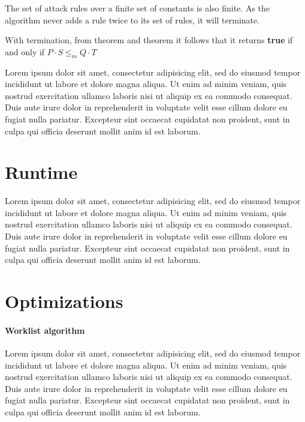 The set of attack rules over a finite set of constants
is also finite.
As the algorithm never adds a rule twice to its set
of rules, it will terminate.

With termination, 
from theorem \label{theorem:refinement-tree} and
theorem \label{theorem:tree-attack} it follows
that it returns \textbf{true} if and only
if $P⋅S ≤_m Q⋅T$

Lorem ipsum dolor sit amet, consectetur adipisicing elit, sed do eiusmod tempor incididunt ut labore et dolore magna aliqua. Ut enim ad minim veniam, quis nostrud exercitation ullamco laboris nisi ut aliquip ex ea commodo consequat. Duis aute irure dolor in reprehenderit in voluptate velit esse cillum dolore eu fugiat nulla pariatur. Excepteur sint occaecat cupidatat non proident, sunt in culpa qui officia deserunt mollit anim id est laborum.


\section{Runtime}

Lorem ipsum dolor sit amet, consectetur adipisicing elit, sed do eiusmod tempor incididunt ut labore et dolore magna aliqua. Ut enim ad minim veniam, quis nostrud exercitation ullamco laboris nisi ut aliquip ex ea commodo consequat. Duis aute irure dolor in reprehenderit in voluptate velit esse cillum dolore eu fugiat nulla pariatur. Excepteur sint occaecat cupidatat non proident, sunt in culpa qui officia deserunt mollit anim id est laborum.


\section{Optimizations}

\paragraph{Worklist algorithm}

Lorem ipsum dolor sit amet, consectetur adipisicing elit, sed do eiusmod tempor incididunt ut labore et dolore magna aliqua. Ut enim ad minim veniam, quis nostrud exercitation ullamco laboris nisi ut aliquip ex ea commodo consequat. Duis aute irure dolor in reprehenderit in voluptate velit esse cillum dolore eu fugiat nulla pariatur. Excepteur sint occaecat cupidatat non proident, sunt in culpa qui officia deserunt mollit anim id est laborum.

